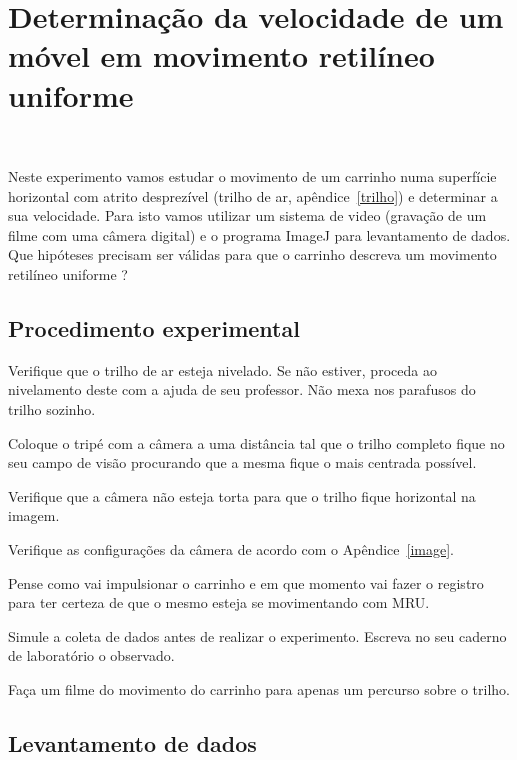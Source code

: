 \chapter{Determinação da velocidade de um móvel em movimento retilíneo uniforme}~\label{mru}

\vspace{-1.1cm}
Neste experimento vamos estudar o movimento de um carrinho numa superfície horizontal com atrito desprezível (trilho de ar, apêndice~\ref{trilho}) e determinar a sua velocidade. Para isto vamos utilizar um sistema de video (gravação de um filme com uma câmera digital) e o programa ImageJ para levantamento de dados. Que hipóteses precisam ser válidas para que o carrinho descreva um movimento retilíneo uniforme ? 

\section*{Procedimento experimental}

\begin{num}
\item Verifique que o trilho de ar esteja nivelado. Se não estiver, proceda ao nivelamento deste com a ajuda de seu professor. Não mexa nos parafusos do trilho sozinho.
\item Coloque o tripé com a câmera a uma distância tal que o trilho completo fique no seu campo de visão procurando que a mesma fique o mais centrada possível.
\item Verifique que a câmera não esteja torta para que o trilho fique horizontal na imagem.
\item Verifique as configurações da câmera de acordo com o Apêndice~\ref{image}.
\item Pense como vai impulsionar o carrinho e em que momento vai fazer o registro para ter certeza de que o mesmo esteja se movimentando com MRU. 
\item Simule a coleta de dados antes de realizar o experimento. Escreva no seu caderno de laboratório o observado.
\item Faça um filme do movimento do carrinho para apenas um percurso sobre o trilho. 
\end{num}

\vspace{-0.5cm}
\section*{Levantamento de dados}


